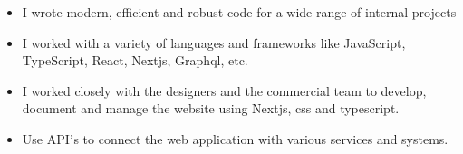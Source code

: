 

\begin{itemize}
    \item I wrote modern, efficient and robust code for a wide range of internal projects
    \item I worked with a variety of languages and frameworks like JavaScript, TypeScript, React, Nextjs, Graphql, etc.
    \item I worked closely with the designers and the commercial team to develop, document and manage the website using Nextjs, css and typescript.
    \item Use APIʼs to connect the web application with various services and systems.
\end{itemize}

